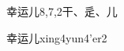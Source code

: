 \begin{entry}{幸运儿}{8,7,2}{⼲、⾡、⼉}
  \begin{phonetics}{幸运儿}{xing4yun4'er2}
  \end{phonetics}
\end{entry}
